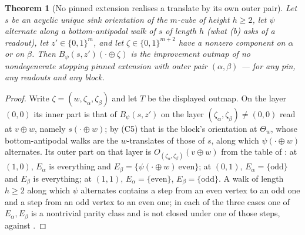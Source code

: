 \documentclass[11pt]{article}
\theoremstyle{plain}
\newtheorem{theorem}{Theorem}[section]
\theoremstyle{definition}
\begin{document}
\begin{theorem}[No pinned extension realises a translate by its own outer pair]\label{thm:pinned-no-translate}
Let $s$ be an acyclic unique sink orientation of the $m$-cube of height
$h\ge2$, let $\psi$ alternate along a bottom-antipodal walk of $s$ of
length $h$ (what (b) asks of a readout), let
$z'\in\{0,1\}^{m}$, and let $\zeta\in\{0,1\}^{m+2}$ have a nonzero
component on $\alpha$ or on $\beta$. Then $B_\psi(s,z')(\cdot\oplus\zeta)$
is the improvement outmap of no nondegenerate stopping pinned extension
with outer pair $(\alpha,\beta)$ --- for any pin, any readouts and any block.
\end{theorem}

\begin{proof}
Write $\zeta=(w,\zeta_\alpha,\zeta_\beta)$ and let $T$ be the displayed
outmap. On the layer $(0,0)$ its inner part is that of $B_\psi(s,z')$ on
the layer $(\zeta_\alpha,\zeta_\beta)\ne(0,0)$ read at $v\oplus w$, namely
$s(\cdot\oplus w)$; by (C5) that is the block's
orientation at $\Theta_w$, whose bottom-antipodal walks are the
$w$-translates of those of $s$, along which $\psi(\cdot\oplus w)$
alternates. Its outer part on that layer is
$O_{(\zeta_\alpha,\zeta_\beta)}(v\oplus w)$ from the table of
: at $(1,0)$, $E_\alpha$ is everything and
$E_\beta=\{\psi(\cdot\oplus w)\ \text{even}\}$; at $(0,1)$,
$E_\alpha=\{\text{odd}\}$ and $E_\beta$ is everything; at $(1,1)$,
$E_\alpha=\{\text{even}\}$, $E_\beta=\{\text{odd}\}$. A walk of length
$h\ge2$ along which $\psi$ alternates contains a step from an even vertex
to an odd one and a step from an odd vertex to an even one; in each of the
three cases one of $E_\alpha,E_\beta$ is a nontrivial parity class and is
not closed under one of those steps, against .
\end{proof}
\end{document}
